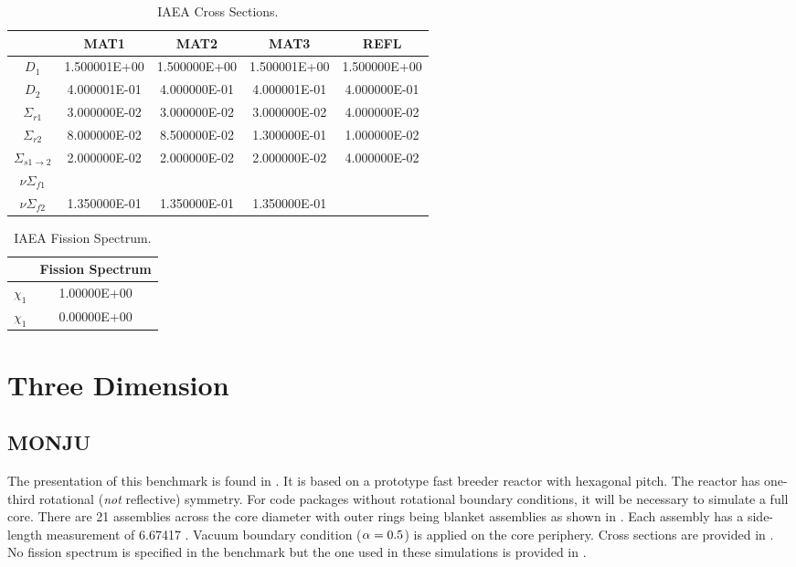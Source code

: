     \begin{table}
      \caption{IAEA Cross Sections.}
      \label{tab:iaeaxs}
      \begin{center}
        \begin{tabular}{ccccc}
          \toprule
          &MAT1&MAT2&MAT3&REFL\\
          \midrule
          $D_1$&1.500001E+00&1.500000E+00&1.500001E+00&1.500000E+00\\
          $D_2$&4.000001E-01&4.000000E-01&4.000001E-01&4.000000E-01\\
          $\Sigma_{r1}$&3.000000E-02&3.000000E-02&3.000000E-02&4.000000E-02\\
          $\Sigma_{r2}$&8.000000E-02&8.500000E-02&1.300000E-01&1.000000E-02\\
          $\Sigma_{s 1\rightarrow 2}$&2.000000E-02&2.000000E-02&2.000000E-02&4.000000E-02\\
          $ \nu \Sigma_{f1}$&&&&\\
          $ \nu \Sigma_{f2}$&1.350000E-01&1.350000E-01&1.350000E-01&\\
          \bottomrule
        \end{tabular}
      \end{center}
    \end{table}
    \begin{table}
      \caption{IAEA Fission Spectrum.}
      \label{tab:iaeachi}
      \begin{center}
        \begin{tabular}{cc}
          \toprule
          &Fission Spectrum \\
          \midrule
          $\chi_1$&1.00000E+00  \\
          $\chi_1$&0.00000E+00  \\
          \bottomrule
        \end{tabular}
      \end{center}
    \end{table}
\section{Three Dimension}
  \subsection{MONJU}
    \label{sec:monju}
    The presentation of this benchmark is found in \cite{monjuBenchmark}. It is
    based on a prototype fast breeder reactor with hexagonal pitch. The reactor
    has one-third rotational (\textit{not} reflective) symmetry. For code
    packages without rotational boundary conditions, it will be necessary to
    simulate a full core. There are 21 assemblies across the core diameter with
    outer rings being blanket assemblies as shown in .
    Each assembly has a side-length measurement of 6.67417 . Vacuum
    boundary condition ($\alpha = 0.5$) is applied on the core periphery. Cross
    sections are provided in . No fission spectrum is
    specified in the benchmark but the one used in these simulations is provided
    in .

